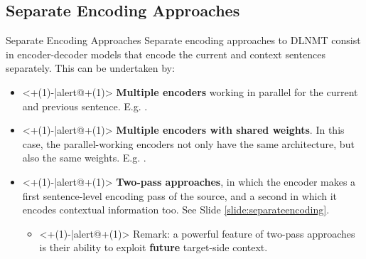 \subsection{Separate Encoding Approaches}

\begin{frame}{Separate Encoding Approaches}
Separate encoding approaches to DLNMT consist in encoder-decoder models that encode the current and context sentences separately. This can be undertaken by:
	\begin{itemize}
		\item<+(1)-|alert@+(1)> \textbf{Multiple encoders} working in parallel for the current and previous sentence. E.g. \cite{wang_exploiting_2017}.
		\item<+(1)-|alert@+(1)> \textbf{Multiple encoders with shared weights}. In this case, the parallel-working encoders not only have the same architecture, but also the same weights. E.g. \cite{voita_context-aware_2018}.
		\item<+(1)-|alert@+(1)> \textbf{Two-pass approaches}, in which the encoder makes a first sentence-level encoding pass of the source, and a second in which it encodes contextual information too. See Slide \ref{slide:separateencoding}.
		\begin{itemize}
			\item<+(1)-|alert@+(1)> Remark: a powerful feature of two-pass approaches is their ability to exploit \textbf{future} target-side context.
		\end{itemize}
	\end{itemize}  
\end{frame}

